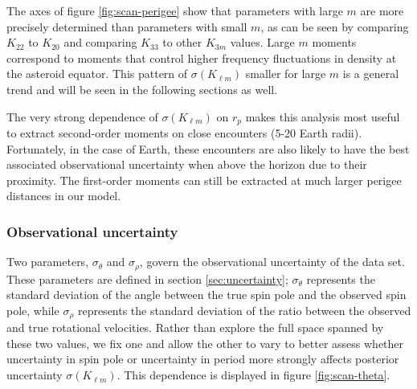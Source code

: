 \documentclass[fleqn,usenatbib]{mnras}
\begin{document}


The axes of figure \ref{fig:scan-perigee} show that parameters with large $m$ are more precisely determined than parameters with small $m$, as can be seen by comparing $K_{22}$ to $K_{20}$ and comparing $K_{33}$ to other $K_{3m}$ values. Large $m$ moments correspond to moments that control higher frequency fluctuations in density at the asteroid equator. This pattern of $\sigma(K_{\ell m})$ smaller for large $m$ is a general trend and will be seen in the following sections as well.

The very strong dependence of $\sigma(K_{\ell m})$ on $r_p$ makes this analysis most useful to extract second-order moments on close encounters (5-20 Earth radii). Fortunately, in the case of Earth, these encounters are also likely to have the best associated observational uncertainty when above the horizon due to their proximity. The first-order moments can still be extracted at much larger perigee distances in our model.




\subsubsection{Observational uncertainty}
\label{sec:scan-uncertainty}
Two parameters, $\sigma_\theta$ and $\sigma_\rho$, govern the observational uncertainty of the data set. These parameters are defined in section \ref{sec:uncertainty}; $\sigma_\theta$ represents the standard deviation of the angle between the true spin pole and the observed spin pole, while $\sigma_\rho$ represents the standard deviation of the ratio between the observed and true rotational velocities. Rather than explore the full space spanned by these two values, we fix one and allow the other to vary to better assess whether uncertainty in spin pole or uncertainty in period more strongly affects posterior uncertainty $\sigma(K_{\ell m})$. This dependence is displayed in figure \ref{fig:scan-theta}.
\end{document}
